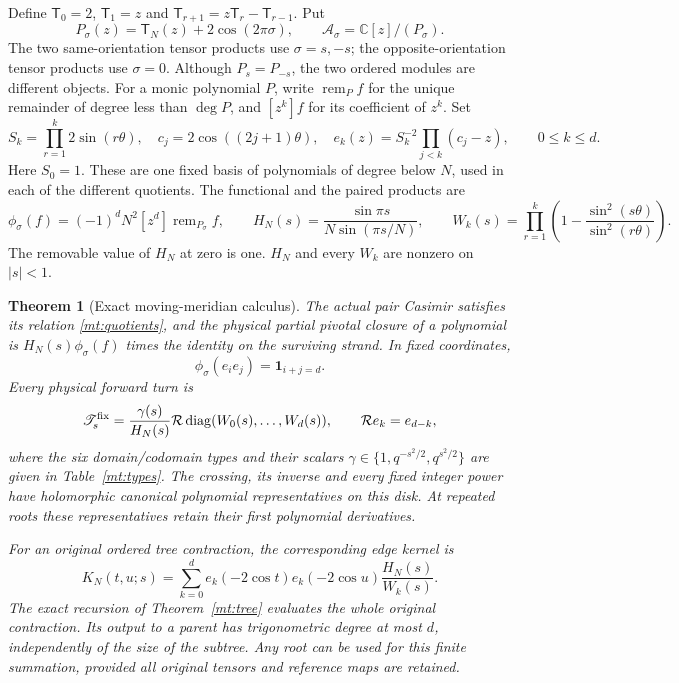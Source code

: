 \documentclass[11pt]{article}
\numberwithin{equation}{section}
\newtheorem{theorem}{Theorem}[section]
\theoremstyle{definition}\newtheorem{definition}[theorem]{Definition}
\theoremstyle{remark}\newtheorem{remark}[theorem]{Remark}
\newcommand{\CC}{\mathbb C}
\newcommand{\remd}{\operatorname{rem}}
\newcommand{\diag}{\operatorname{diag}}
\newcommand{\Cheb}{\mathsf T}
\newcommand{\Turn}{\mathscr T}
\newcommand{\Rrev}{\mathcal R}
\newcommand{\Acal}{\mathcal A}
\begin{document}
Define $\Cheb_0=2$, $\Cheb_1=z$ and
$\Cheb_{r+1}=z\Cheb_r-\Cheb_{r-1}$. Put
\begin{equation}\label{mt:quotients}
 P_\sigma(z)=\Cheb_N(z)+2\cos(2\pi\sigma),\qquad
 \Acal_\sigma=\CC[z]/(P_\sigma).
\end{equation}
The two same-orientation tensor products use $\sigma=s,-s$;
the opposite-orientation tensor products use $\sigma=0$. Although
$P_s=P_{-s}$, the two ordered modules are different objects.
For a monic polynomial $P$, write $\remd_Pf$ for the unique remainder
of degree less than $\deg P$, and $[z^k]f$ for its coefficient of $z^k$. Set
\begin{equation}\label{mt:fixed-basis}
 S_k=\prod_{r=1}^k2\sin(r\theta),\quad
 c_j=2\cos((2j+1)\theta),\quad
 e_k(z)=S_k^{-2}\prod_{j<k}(c_j-z),\qquad 0\le k\le d.
\end{equation}
Here $S_0=1$. These are one fixed basis of polynomials of degree below
$N$, used in each of the different quotients. The functional and the
paired products are
\begin{equation}\label{mt:factors}
 \phi_\sigma(f)=(-1)^dN^2[z^d]\remd_{P_\sigma}f,\qquad
 H_N(s)=\frac{\sin\pi s}{N\sin(\pi s/N)},\qquad
 W_k(s)=\prod_{r=1}^k\left(1-
              \frac{\sin^2(s\theta)}{\sin^2(r\theta)}\right).
\end{equation}
The removable value of $H_N$ at zero is one. $H_N$ and every $W_k$ are nonzero on $|s|<1$.

\begin{theorem}[Exact moving-meridian calculus]\label{mt:main}
The actual pair Casimir satisfies its relation \eqref{mt:quotients},
and the physical partial pivotal closure of a polynomial is
$H_N(s)\phi_\sigma(f)$ times the identity on the surviving strand.
In fixed coordinates,
\[
 \phi_\sigma(e_i e_j)=\mathbf1_{i+j=d}.
\]
Every physical forward turn is
\begin{equation}\label{mt:turn-main}
 \Turn_s^{\rm fix}=\frac{\gamma(s)}{H_N(s)}
                 \Rrev\diag(W_0(s),\ldots,W_d(s)),\qquad
 \Rrev e_k=e_{d-k},
\end{equation}
where the six domain/codomain types and their scalars
$\gamma\in\{1,q^{-s^2/2},q^{s^2/2}\}$ are given in
Table~\ref{mt:types}. The crossing, its inverse and every fixed integer
power have holomorphic canonical polynomial representatives on this
disk. At repeated roots these representatives retain their first
polynomial derivatives.

For an original ordered tree contraction, the corresponding edge kernel is
\begin{equation}\label{mt:kernel-main}
 K_N(t,u;s)=\sum_{k=0}^d e_k(-2\cos t)e_k(-2\cos u)
                                      \frac{H_N(s)}{W_k(s)}.
\end{equation}
The exact recursion of Theorem~\ref{mt:tree} evaluates the whole original
contraction. Its output to a parent has trigonometric degree at most
$d$, independently of the size of the subtree. Any root can be used
for this finite summation, provided all original tensors and reference
maps are retained.
\end{theorem}
\end{document}
